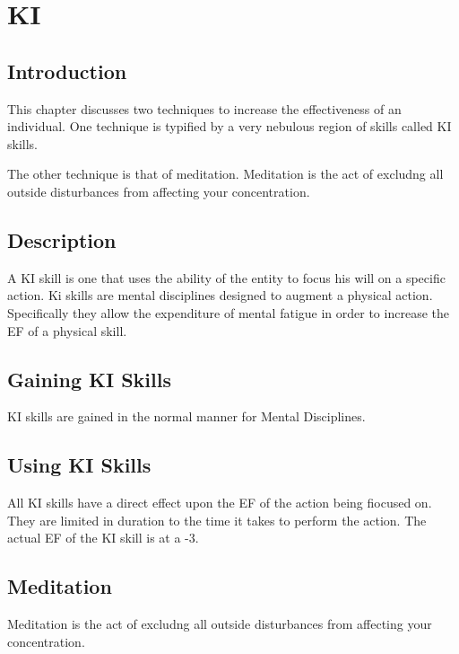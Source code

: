 \chapter{KI}

\section{Introduction}

This chapter discusses two techniques to increase the effectiveness 
of an individual. One technique is typified by a  very nebulous 
region of skills called KI skills. 

The other technique is that of meditation. 
Meditation is the act of excludng all outside disturbances from 
affecting your concentration.  

\section{Description}

A KI skill is one that uses the ability of the entity to focus his
will on a specific action. Ki skills are mental disciplines designed
to augment a physical action. Specifically they allow the expenditure
of mental fatigue in order to increase the EF of a physical skill.  

\section{Gaining KI Skills}

KI skills are gained in the normal manner for Mental Disciplines. 

\section{Using KI Skills}

All KI skills have a direct effect upon the EF of the action being 
fiocused on. They are limited in duration to the time it takes to 
perform the action. The actual EF of the KI skill is at a -3. 

\section{Meditation}

Meditation is the act of excludng all outside disturbances from 
affecting your concentration.  


